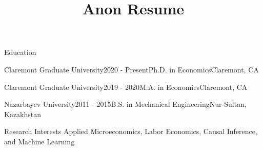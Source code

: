 \documentclass{resume} %
\begin{document}
\title{Anon Resume}

\begin{rSection}{Education}

\begin{rSubsection}{Claremont Graduate University}{2020 - Present}{Ph.D. in Economics}{Claremont, CA}



\vspace{-.90cm}
\item[]
\end{rSubsection}
\begin{rSubsection}{Claremont Graduate University}{2019 - 2020}{M.A. in Economics}{Claremont, CA}



\vspace{-.90cm}
\item[]
\end{rSubsection}

\begin{rSubsection}{Nazarbayev University}{2011 - 2015}{B.S. in Mechanical Engineering}{Nur-Sultan, Kazakhstan}



\vspace{-.90cm}
\item[]
\end{rSubsection}

\end{rSection}



\begin{rSection}{Research Interests}
Applied Microeconomics, Labor Economics, Causal Inference, and Machine Learning
\end{rSection}

\end{document}
